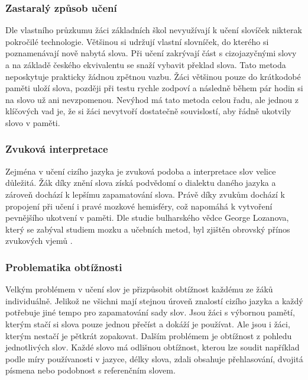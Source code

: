 \documentclass[a4paper,11pt,titlepage,fleqn]{article}
\begin{document}
        \subsubsection{Zastaralý způsob učení}
            Dle vlastního průzkumu žáci základních škol nevyužívají k učení slovíček nikterak pokročilé technologie. Většinou si udržují vlastní slovníček, do kterého si poznamenávají nově nabytá slova. Při učení zakrývají část s cizojazyčnými slovy a na základě českého ekvivalentu se snaží vybavit překlad slova. Tato metoda neposkytuje prakticky žádnou zpětnou vazbu. Žáci většinou pouze do krátkodobé paměti uloží slova, později při testu rychle zodpoví a následně během pár hodin si na slovo už ani nevzpomenou. Nevýhod má tato metoda celou řadu, ale jednou z klíčových vad je, že si žáci nevytvoří dostatečně souvislostí, aby řádně ukotvily slovo v paměti.

        \subsubsection{Zvuková interpretace}
            Zejména v učení cizího jazyka je zvuková podoba a interpretace slov velice důležitá. Žák díky znění slova získá podvědomí o dialektu daného jazyka a zároveň dochází k lepšímu zapamatování slova. Právě díky zvukům dochází k propojení při učení i pravé mozkové hemisféry, což napomáhá k vytvoření pevnějšího ukotvení v paměti. Dle studie bulharského vědce George Lozanova, který se zabýval studiem mozku a učebních metod, byl zjištěn obrovský přínos zvukových vjemů \cite{bib:suggestology}.

        \subsubsection{Problematika obtížnosti}
            Velkým problémem v učení slov je přizpůsobit obtížnost každému ze žáků individuálně. Jelikož ne všichni mají stejnou úroveň znalostí cizího jazyka a každý potřebuje jiné tempo pro zapamatování sady slov. Jsou žáci s výbornou pamětí, kterým stačí si slova pouze jednou přečíst a dokáží je používat. Ale jsou i žáci, kterým nestačí je pětkrát zopakovat. Dalším problémem je obtížnost z pohledu jednotlivých slov. Každé slovo má odlišnou obtížnost, kterou lze soudit například podle míry používanosti v jazyce, délky slova, zdali obsahuje přehlasování, dvojitá písmena nebo podobnost s referenčním slovem.
\end{document}
